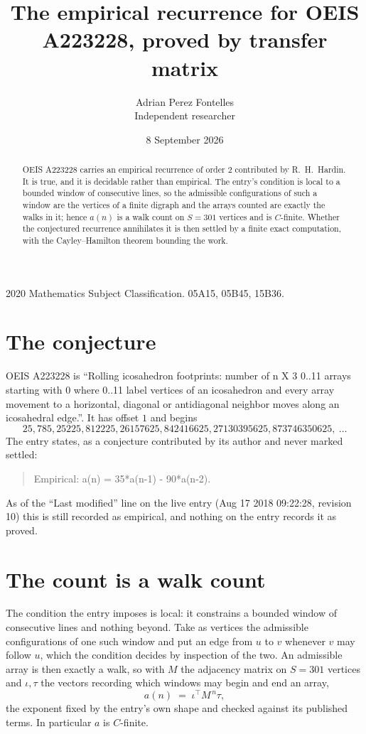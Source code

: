 \documentclass[11pt,a4paper]{article}
\title{The empirical recurrence for OEIS A223228, proved by transfer matrix}
\author{Adrian Perez Fontelles\\ \small Independent researcher}
\date{8 September 2026}
\theoremstyle{plain}
\theoremstyle{definition}
\begin{document}
\maketitle

\begin{abstract}
OEIS A223228 carries an empirical recurrence of order $2$ contributed by R.~H.~Hardin. It is
true, and it is decidable rather than empirical. The entry's condition is local to a bounded window of consecutive lines, so
the admissible configurations of such a window are the vertices of a finite digraph and the
arrays counted are exactly the walks in it; hence $a(n)$ is a walk count on $S=301$ vertices
and is $C$-finite. Whether the conjectured recurrence annihilates it is then settled by a
finite exact computation, with the Cayley--Hamilton theorem bounding the work.
\end{abstract}

\noindent\small 2020 Mathematics Subject Classification. 05A15, 05B45, 15B36.\normalsize

\section{The conjecture}

OEIS A223228 is ``Rolling icosahedron footprints: number of n X 3 0..11 arrays starting with 0 where 0..11 label vertices of an icosahedron and every array movement to a horizontal, diagonal or antidiagonal neighbor moves along an icosahedral edge.''. It has offset $1$ and begins
\[
25, 785, 25225, 812225, 26157625, 842416625, 27130395625, 873746350625,\ \dots
\]
The entry states, as a conjecture contributed by its author and never marked settled:
\begin{quote}
Empirical: a(n) = 35*a(n-1) - 90*a(n-2).
\end{quote}
As of the ``Last modified'' line on the live entry (Aug 17 2018 09:22:28, revision 10) this is still
recorded as empirical, and nothing on the entry records it as proved.

\section{The count is a walk count}

The condition the entry imposes is local: it constrains a bounded window of consecutive lines and nothing beyond. Take as
vertices the admissible configurations of one such window and put an edge from $u$ to $v$
whenever $v$ may follow $u$, which the condition decides by inspection of the two. An
admissible array is then exactly a walk, so with $M$ the adjacency matrix on $S=301$ vertices
and $\iota,\tau$ the vectors recording which windows may begin and end an array,
\[
a(n)\;=\;\iota^{\!\top}M^{\,n}\tau ,
\]
the exponent fixed by the entry's own shape and checked against its published terms. In
particular $a$ is $C$-finite.
\end{document}
